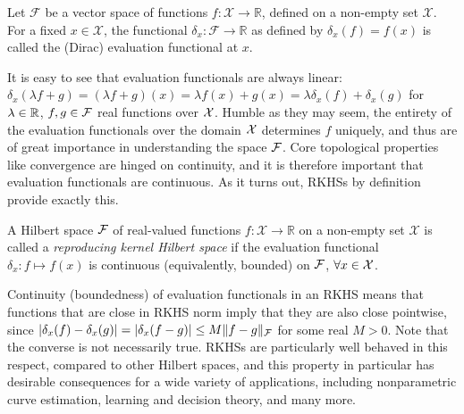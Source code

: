\begin{definition}
  Let $\mathcal F$ be a vector space of functions $f:\mathcal X \rightarrow \mathbb R$, defined on a non-empty set $\mathcal X$. 
  For a fixed $x \in \mathcal X$, the functional $\delta_x:\mathcal F \rightarrow \mathbb R$ as defined by $\delta_x(f) = f(x)$ is called the (Dirac) evaluation functional at $x$.
\end{definition}

It is easy to see that evaluation functionals are always linear: $\delta_x(\lambda f + g) = (\lambda f + g)(x) = \lambda f(x) + g(x) = \lambda\delta_x(f) + \delta_x(g)$ for $\lambda\in\mathbb{R}$, $f,g\in{\mathcal F}$ real functions over ${\mathcal X}$.
Humble as they may seem, the entirety of the evaluation functionals over the domain ${\mathcal X}$ determines $f$ uniquely, and thus are of great importance in understanding the space ${\mathcal F}$.
Core topological properties like convergence are hinged on continuity, and it is therefore important that evaluation functionals are continuous.
As it turns out, RKHSs by definition provide exactly this.

\begin{definition}\label{def:rkhs}
	A Hilbert space ${\mathcal F}$ of real-valued functions $f:\mathcal X \rightarrow \mathbb R$ on a non-empty set $\mathcal X$ is called a \emph{reproducing kernel Hilbert space} if the evaluation functional $\delta_x: f \mapsto f(x)$ is continuous (equivalently, bounded) on ${\mathcal F}$, $\forall x \in {\mathcal X}$. 
\end{definition}

Continuity (boundedness) of evaluation functionals in an RKHS means that functions that are close in RKHS norm imply that they are also close pointwise, since $\vert \delta_x(f) - \delta_x(g) \vert = \vert \delta_x(f-g) \vert \leq M\Vert f-g \Vert_{\mathcal F}$ for some real $M>0$.
Note that the converse is not necessarily true.
RKHSs are particularly well behaved in this respect, compared to other Hilbert spaces, and this property in particular has desirable consequences for a wide variety of applications, including nonparametric curve estimation, learning and decision theory, and many more.

